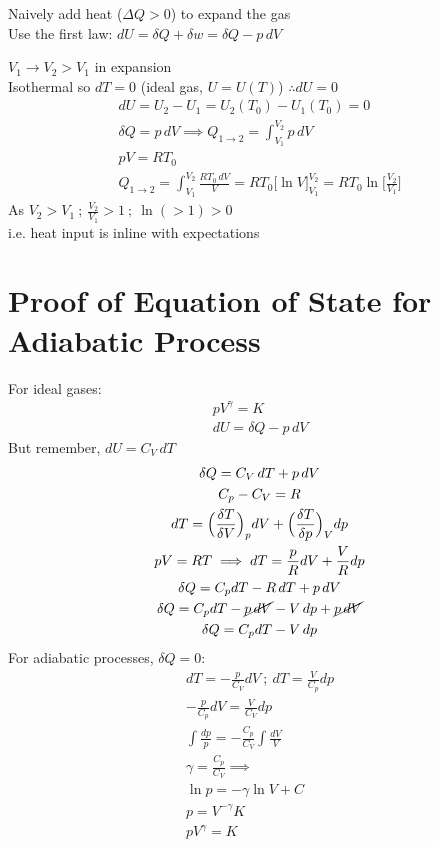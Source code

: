 \documentclass[a4paper, 11pt, normalem]{report}
\begin{document}
Naively add heat ($\Delta Q > 0$) to expand the gas \\
Use the first law: $dU = \delta Q + \delta w = \delta Q - p\,dV$

$V_1 \to V_2 > V_1$ in expansion \\
Isothermal so $dT = 0$ (ideal gas, $U = U(T)$) $\therefore dU = 0$
\begin{gather*}
    dU = U_2 - U_1 = U_{2}(T_{0}) - U_{1}(T_{0}) = 0 \\
    \delta Q = p\,dV \implies Q_{1\to2} = \int_{V_{1}}^{V_{2}} p\,dV \\
    pV = RT_0 \\
    Q_{1\to2} = \int_{V_{1}}^{V_{2}} \frac{RT_{0}\,dV}{V} = RT_{0}\Big[\ln V \Big]_{V_{1}}^{V_{2}} = RT_{0}\ln\bigg[\frac{V_{2}}{V_1}\bigg]
\end{gather*}
As $V_2 > V_1 ~;~ \frac{V_2}{V_1} > 1 ~;~ \ln(> 1) > 0$ \\
i.e. heat input is inline with expectations

\section{Proof of Equation of State for Adiabatic Process}
For ideal gases:
\begin{gather*}
    pV^{\gamma} = K \\
    dU = \delta Q - p\,dV
\end{gather*}
But remember, $dU = C_V \, dT$
\begin{gather*}
    \delta Q = C_V \, dT + p\,dV \\
    C_p - C_V = R \\
    dT = \Big(\frac{\delta T}{\delta V} \Big)_p dV + \Big(\frac{\delta T}{\delta p} \Big)_V dp \\
    pV = RT \implies dT = \frac{p}{R}dV + \frac{V}{R}dp \\
    \delta Q = C_p dT - R\,dT + p\,dV \\
    \delta Q = C_p dT - \cancel{p\,dV} - V\,dp + \cancel{p\,dV} \\
    \delta Q = C_p dT - V\,dp
\end{gather*}
For adiabatic processes, $\delta Q = 0$:
\begin{gather*}
    dT = -\frac{p}{C_V}dV ~;~ dT = \frac{V}{C_p}dp \\
    -\frac{p}{C_p}dV = \frac{V}{C_V}dp \\
    \int \frac{dp}{p} = -\frac{C_p}{C_V}\int \frac{dV}{V} \\
    \gamma = \frac{C_p}{C_V} \implies \\
    \ln p = -\gamma \ln V + C \\
    p = V^{-\gamma}K \\
    pV^{\gamma} = K
\end{gather*}
\end{document}
